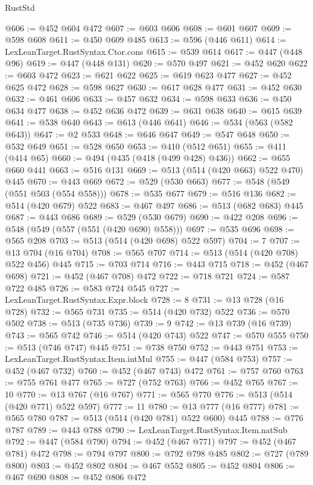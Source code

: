 \begin{lexlean}{RustStd}
\begin{coremodule}
@606 := @452 @604 @472
@607 := @603 @606
@608 := @601 @607
@609 := @598 @608
@611 := @450 @609 @485
@613 := @596 (@446 @611)
@614 := LexLeanTarget.RustSyntax.Ctor.cons
@615 := @539 @614
@617 := @447 (@448 @96)
@619 := @447 (@448 @131)
@620 := @570 @497
@621 := @452 @620
@622 := @603 @472
@623 := @621 @622
@625 := @619 @623 @477
@627 := @452 @625 @472
@628 := @598 @627
@630 := @617 @628 @477
@631 := @452 @630
@632 := @461 @606
@633 := @457 @632
@634 := @598 @633
@636 := @450 @634 @477
@638 := @452 @636 @472
@639 := @631 @638
@640 := @615 @639
@641 := @538 @640
@643 := @613 (@446 @641)
@646 := @534 (@563 (@582 @643))
@647 := @2 @533
@648 := @646 @647
@649 := @547 @648
@650 := @532 @649
@651 := @528 @650
@653 := @410 (@512 @651)
@655 := @411 (@414 @65)
@660 := @494 (@435 (@418 (@499 @428) @436))
@662 := @655 @660 @441
@663 := @516 @131
@669 := @513 (@514 (@420 @663) @522 @470) @445
@670 := @443 @669
@672 := @529 (@530 @663)
@677 := @548 (@549 (@551 @503 (@554 @558)))
@678 := @535 @677
@679 := @516 @136
@682 := @514 (@420 @679) @522
@683 := @467 @497
@686 := @513 (@682 @683) @445
@687 := @443 @686
@689 := @529 (@530 @679)
@690 := @422 @208
@696 := @548 (@549 (@557 (@551 (@420 @690) @558)))
@697 := @535 @696
@698 := @565 @208
@703 := @513 (@514 (@420 @698) @522 @597)
@704 := 7
@707 := @13 @704 (@16 @704)
@708 := @565 @707
@714 := @513 (@514 (@420 @708) @522 @456) @445
@715 := @703 @714
@716 := @443 @715
@718 := @452 (@467 @698)
@721 := @452 (@467 @708) @472
@722 := @718 @721
@724 := @587 @722 @485
@726 := @583 @724 @545
@727 := LexLeanTarget.RustSyntax.Expr.block
@728 := 8
@731 := @13 @728 (@16 @728)
@732 := @565 @731
@735 := @514 (@420 @732) @522
@736 := @570 @502
@738 := @513 (@735 @736)
@739 := 9
@742 := @13 @739 (@16 @739)
@743 := @565 @742
@746 := @514 (@420 @743) @522
@747 := @570 @555
@750 := @513 (@746 @747) @445
@751 := @738 @750
@752 := @443 @751
@753 := LexLeanTarget.RustSyntax.Item.intMul
@755 := @447 (@584 @753)
@757 := @452 (@467 @732)
@760 := @452 (@467 @743) @472
@761 := @757 @760
@763 := @755 @761 @477
@765 := @727 (@752 @763)
@766 := @452 @765
@767 := 10
@770 := @13 @767 (@16 @767)
@771 := @565 @770
@776 := @513 (@514 (@420 @771) @522 @597)
@777 := 11
@780 := @13 @777 (@16 @777)
@781 := @565 @780
@787 := @513 (@514 (@420 @781) @522 @600) @445
@788 := @776 @787
@789 := @443 @788
@790 := LexLeanTarget.RustSyntax.Item.natSub
@792 := @447 (@584 @790)
@794 := @452 (@467 @771)
@797 := @452 (@467 @781) @472
@798 := @794 @797
@800 := @792 @798 @485
@802 := @727 (@789 @800)
@803 := @452 @802
@804 := @467 @552
@805 := @452 @804
@806 := @467 @690
@808 := @452 @806 @472

\end{coremodule}
\end{lexlean}
